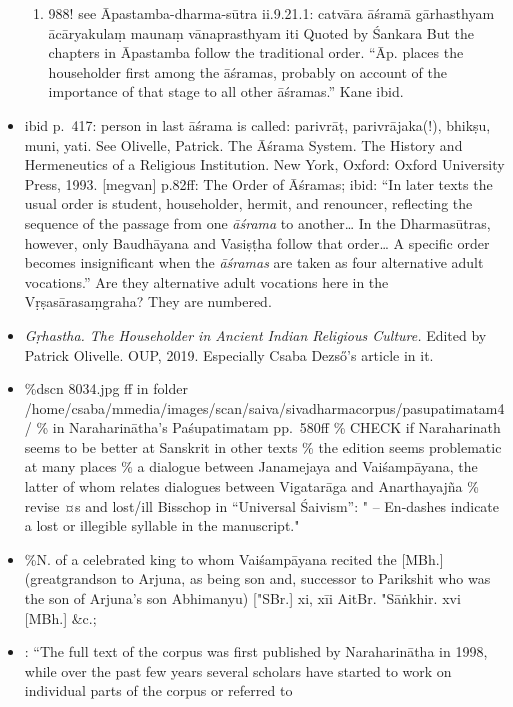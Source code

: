 \documentclass[11pt]{book}
\begin{document}
\begin{itemize}
\begin{enumerate}
  \item
    988! see Āpastamba-dharma-sūtra ii.9.21.1: catvāra āśramā
    gārhasthyam ācāryakulaṃ maunaṃ vānaprasthyam iti\textbar{} Quoted by
    Śankara But the chapters in Āpastamba follow the traditional order.
    ``Āp. places the householder first among the āśramas, probably on
    account of the importance of that stage to all other āśramas.'' Kane
    ibid.
  \end{enumerate}
\item
  ibid p.~417: person in last āśrama is called: parivrāṭ,
  parivrājaka(!), bhikṣu, muni, yati. See Olivelle, Patrick. The Āśrama
  System. The History and Hermeneutics of a Religious Institution. New
  York, Oxford: Oxford University Press, 1993. {[}megvan{]} p.82ff: The
  Order of Āśramas; ibid: ``In later texts the usual order is student,
  householder, hermit, and renouncer, reflecting the sequence of the
  passage from one \emph{āśrama} to another\ldots{} In the Dharmasūtras,
  however, only Baudhāyana and Vasiṣṭha follow that order\ldots{} A
  specific order becomes insignificant when the \emph{āśramas} are taken
  as four alternative adult vocations.'' Are they alternative adult
  vocations here in the Vṛṣasārasaṃgraha? They are numbered.
\item
  \textit{Gṛhastha. The Householder in Ancient Indian 
      Religious Culture.} Edited by Patrick Olivelle. OUP, 2019.
  Especially Csaba Dezső's article in it.
\item
  \%dscn 8034.jpg ff in folder
  /home/csaba/mmedia/images/scan/saiva/sivadharmacorpus/pasupatimatam4/
  \% in Naraharinātha's Paśupatimatam pp.~580ff \% CHECK if Naraharinath
  seems to be better at Sanskrit in other texts \% the edition seems
  problematic at many places \% a dialogue between Janamejaya and
  Vaiśampāyana, the latter of whom relates dialogues between Vigatarāga
  and Anarthayajña \% revise ¤s and lost/ill Bisschop in ``Universal
  Śaivism'': " -- En-dashes indicate a lost or illegible syllable in the
  manuscript."
\item
  \%N. of a celebrated king to whom Vaiśampāyana recited the {[}MBh.{]}
  (greatgrandson to Arjuna, as being son and, successor to Parikshit who
  was the son of Arjuna's son Abhimanyu) {[}"SBr.{]} xi, xīi AitBr.
  "Sāṅkhir. xvi {[}MBh.{]} \&c.;
\item
  : ``The full text of the corpus was first published by
  Naraharinātha in 1998, while over the past few years several scholars
  have started to work on individual parts of the corpus or referred to

\end{itemize}
\end{document}
